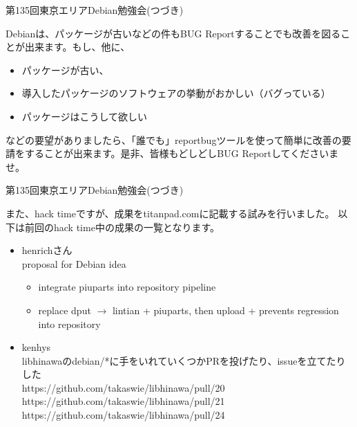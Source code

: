 \begin{frame}{第135回東京エリアDebian勉強会(つづき)}

  Debianは、パッケージが古いなどの件もBUG Reportすることでも改善を図ることが出来ます。もし、他に、
\begin{itemize}
\item パッケージが古い、
\item 導入したパッケージのソフトウェアの挙動がおかしい（バグっている）
\item パッケージはこうして欲しい
\end{itemize}
などの要望がありましたら、「誰でも」reportbugツールを使って簡単に改善の要請をすることが出来ます。是非、皆様もどしどしBUG Reportしてくださいませ。
  
\end{frame}

\begin{frame}{第135回東京エリアDebian勉強会(つづき)}

  また、hack timeですが、成果をtitanpad.comに記載する試みを行いました。
以下は前回のhack time中の成果の一覧となります。
\begin{itemize}
\item henrichさん\\
  proposal for Debian idea
  \begin{itemize}
  \item integrate piuparts into repository pipeline
  \item replace dput $\rightarrow$ lintian + piuparts, then upload
   + prevents regression into repository
  \end{itemize}
\item kenhys \\
libhinawaのdebian/*に手をいれていくつかPRを投げたり、issueを立てたりした\\
https://github.com/takaswie/libhinawa/pull/20\\
https://github.com/takaswie/libhinawa/pull/21\\
https://github.com/takaswie/libhinawa/pull/24
\end{itemize}
\end{frame}

